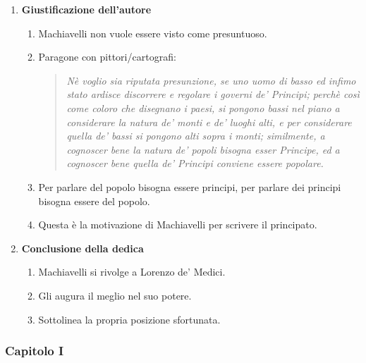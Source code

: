 \documentclass{article}
\begin{document}
\begin{enumerate}
    \item \textbf{Giustificazione dell'autore}
    \begin{enumerate}[label*=\arabic*.]
        \item Machiavelli non vuole essere visto come presuntuoso.
        \item Paragone con pittori/cartografi:
        \begin{quote}
            \itshape
            Nè voglio sia riputata presunzione, se uno uomo di basso ed infimo stato ardisce discorrere e regolare i governi de' Principi; perchè così come coloro che disegnano i paesi, si pongono bassi nel piano a considerare la natura de' monti e de' luoghi alti, e per considerare quella de' bassi si pongono alti sopra i monti; similmente, a cognoscer bene la natura de' popoli bisogna esser Principe, ed a cognoscer bene quella de' Principi conviene essere popolare.
        \end{quote}
        \item Per parlare del popolo bisogna essere principi, per parlare dei principi bisogna essere del popolo.
        \item Questa è la motivazione di Machiavelli per scrivere il principato.
    \end{enumerate}

    \item \textbf{Conclusione della dedica}
    \begin{enumerate}[label*=\arabic*.]
        \item Machiavelli si rivolge a Lorenzo de' Medici.
        \item Gli augura il meglio nel suo potere.
        \item Sottolinea la propria posizione sfortunata.
    \end{enumerate}
\end{enumerate}

\newpage
\subsubsection{Capitolo I}
\end{document}
